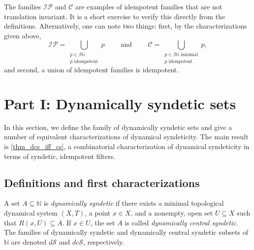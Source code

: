 \documentclass[letter,11pt]{article}
\theoremstyle{plain}
\theoremstyle{definition}
\theoremstyle{plain}
\theoremstyle{plain}
\numberwithin{equation}{section}
\newcommand{\N}{\mathbb{N}}
\newcommand{\dsyndetic}{d\mathcal{S}}
\newcommand{\dcsyndetic}{dc\mathcal{S}}
\newcommand{\central}{\mathcal{C}}
\newcommand{\IP}{\mathcal{IP}}
\begin{document}
The families $\IP$ and $\central$ are examples of idempotent families that are not translation invariant.  It is a short exercise to verify this directly from the definitions.  Alternatively, one can note two things: first, by the characterizations given above,
\[\IP = \bigcup_{\substack{p \in \beta \N \\ p \text{ idempotent}}} p \qquad \text{ and } \qquad \central = \bigcup_{\substack{p \in \beta \N \text{ minimal} \\ p \text{ idempotent}}} p,\]
and second, a union of idempotent families is idempotent.



\section{Part I: Dynamically syndetic sets}
\label{sec_dsyndetic}

In this section, we define the family of dynamically syndetic sets and give a number of equivalent characterizations of dynamical syndeticity.  The main result is \cref{thm_dcs_iff_cs}, a combinatorial characterization of dynamical syndeticity in terms of syndetic, idempotent filters.

\subsection{Definitions and first characterizations}
\label{sec_dy_synd_def_and_char}

A set $A \subseteq \N$ is \emph{dynamically syndetic} if there exists a minimal topological dynamical system $(X,T)$, a point $x \in X$, and a nonempty, open set $U \subseteq X$ such that $R(x,U) \subseteq A$.  If $x \in U$, the set $A$ is called \emph{dynamically central syndetic}.  The families of dynamically syndetic and dynamically central syndetic subsets of $\N$ are denoted $\dsyndetic$ and $\dcsyndetic$, respectively.
\end{document}
